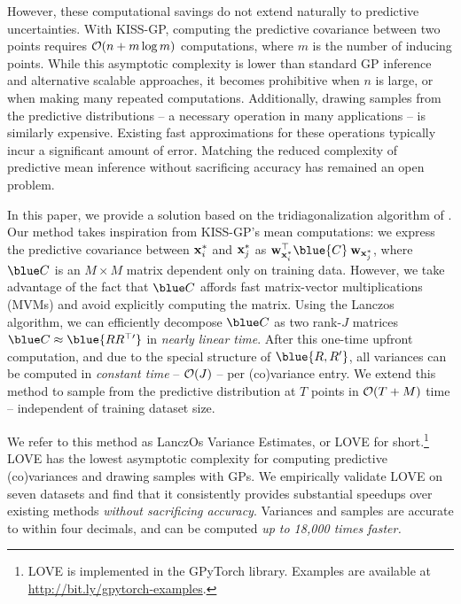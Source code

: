 However, these computational savings do not extend naturally to predictive uncertainties.
With KISS-GP, computing the predictive covariance between two points requires $\bigo{n + m \log m}$ computations, where $m$ is the number of inducing points.
While this asymptotic complexity is lower than standard GP inference and alternative scalable approaches, it becomes prohibitive when $n$ is large, or when making many repeated computations.
Additionally, drawing samples from the predictive distributions -- a necessary operation in many applications -- is similarly expensive.
Existing fast approximations for these operations \cite{papandreou2011efficient,wilson2015thoughts,wang2017max} typically incur a significant amount of error.
Matching the reduced complexity of predictive mean inference without sacrificing accuracy has remained an open problem.

In this paper, we provide a solution based on the tridiagonalization algorithm of \citet{lanczos1950iteration}.
Our method takes inspiration from KISS-GP's mean computations: we express the predictive covariance between $\mathbf{x}^*_i$ and $\mathbf{x}^{*}_j$ as
$\bw_{\bxtest_i}^\top \blue{\bC} \: \bw_{\bxtest_j}$,
where $\blue C$ is an $M \times M$ matrix dependent only on training data.
However, we take advantage of the fact that $\blue \bC$ affords fast matrix-vector multiplications (MVMs) and avoid explicitly computing the matrix.
Using the Lanczos algorithm, we can efficiently decompose $\blue \bC$ as two rank-$J$ matrices $\blue \bC \approx \blue{\bR \bR^{\top \prime}}$ in \emph{nearly linear time}.
After this one-time upfront computation, and due to the special structure of $\blue {\bR,\bR^\prime}$, all variances can be computed in \emph{constant time} -- $\bigo{J}$ -- per (co)variance entry.
We extend this method to sample from the predictive distribution at $T$ points in $\bigo{T + M}$ time -- independent of training dataset size.

We refer to this method as LanczOs Variance Estimates, or LOVE{} for short.\footnote{
  LOVE{} is implemented in the GPyTorch library.
  Examples are available at \url{http://bit.ly/gpytorch-examples}.
}
LOVE{} has the lowest asymptotic complexity for computing predictive (co)variances and drawing samples with GPs.
We empirically validate LOVE{} on seven datasets and find that it consistently provides substantial speedups over existing methods \emph{without sacrificing accuracy}.
Variances and samples are accurate to within four decimals, and can be computed \emph{up to 18,000 times faster.}
